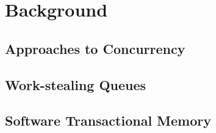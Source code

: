 \section{Background}
\label{sec:background}

\subsection{Approaches to Concurrency}


\subsection{Work-stealing Queues} %


\subsection{Software Transactional Memory}
